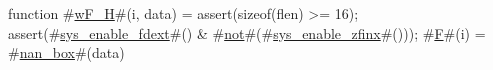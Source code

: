 function #\hyperref[sailRISCVzwFzyH]{wF\_H}#(i, data) = {
  assert(sizeof(flen) >= 16);
  assert(#\hyperref[sailRISCVzsyszyenablezyfdext]{sys\_enable\_fdext}#() & #\hyperref[sailRISCVznot]{not}#(#\hyperref[sailRISCVzsyszyenablezyzzfinx]{sys\_enable\_zfinx}#()));
  #\hyperref[sailRISCVzF]{F}#(i) = #\hyperref[sailRISCVznanzybox]{nan\_box}#(data)
}
